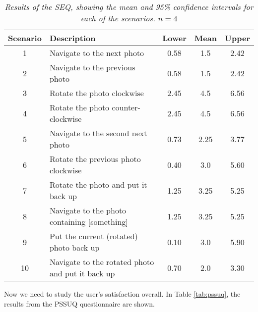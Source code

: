 \documentclass[11pt,a4paper]{article}
\begin{document}
\renewcommand{\arraystretch}{1.0}
\begin{table}[h!]
\begin{center}
\begin{tabular}{c  l || c || c | c}
\textbf{Scenario} & \textbf{Description} & 
\textbf{Lower} &
\textbf{Mean} &
\textbf{Upper} \\
\hline
1 & Navigate to the next photo & 0.58 & 1.5 & 2.42 \\
2 & Navigate to the previous photo & 0.58 & 1.5 & 2.42 \\
3 & Rotate the photo clockwise & 2.45 & 4.5 & 6.56 \\
4 & Rotate the photo counter-clockwise  & 2.45 & 4.5 & 6.56 \\
5 & Navigate to the second next photo & 0.73 & 2.25 & 3.77 \\
6 & Rotate the previous photo clockwise & 0.40 & 3.0 & 5.60 \\
7 & Rotate the photo and put it back up & 1.25 & 3.25 & 5.25\\
8 & Navigate to the photo containing [something]& 1.25 & 3.25 & 5.25\\
9 & Put the current (rotated) photo back up  & 0.10 & 3.0 & 5.90\\
10 & Navigate to the rotated photo and put it back up & 0.70 & 2.0 & 3.30\\
\end{tabular}
\end{center}
\caption{\textit{Results of the SEQ, showing the mean and 95\% confidence intervals for each of the scenarios. $n=4$}}
\label{tab:seq}
\end{table}

Now we need to study the user's satisfaction overall. In Table \ref{tab:pssuq}, the results from the PSSUQ questionnaire are shown. 
\end{document}
